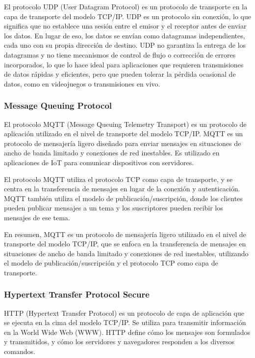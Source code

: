 El protocolo UDP (User Datagram Protocol) es un protocolo de transporte en la capa de transporte del modelo TCP/IP. UDP es un protocolo sin conexión, lo que significa que no establece una sesión entre el emisor y el receptor antes de enviar los datos. En lugar de eso, los datos se envían como datagramas independientes, cada uno con su propia dirección de destino. UDP no garantiza la entrega de los datagramas y no tiene mecanismos de control de flujo o corrección de errores incorporados, lo que lo hace ideal para aplicaciones que requieren transmisiones de datos rápidas y eficientes, pero que pueden tolerar la pérdida ocasional de datos, como en videojuegos o transmisiones en vivo.


\subsubsection{Message Queuing Protocol}

El protocolo MQTT (Message Queuing Telemetry Transport) es un protocolo de aplicación utilizado en el nivel de transporte del modelo TCP/IP. MQTT es un protocolo de mensajería ligero diseñado para enviar mensajes en situaciones de ancho de banda limitado y conexiones de red inestables. Es utilizado en aplicaciones de IoT para comunicar dispositivos con servidores.

El protocolo MQTT utiliza el protocolo TCP como capa de transporte, y se centra en la transferencia de mensajes en lugar de la conexión y autenticación. MQTT también utiliza el modelo de publicación/suscripción, donde los clientes pueden publicar mensajes a un tema y los suscriptores pueden recibir los mensajes de ese tema.

En resumen, MQTT es un protocolo de mensajería ligero utilizado en el nivel de transporte del modelo TCP/IP, que se enfoca en la transferencia de mensajes en situaciones de ancho de banda limitado y conexiones de red inestables, utilizando el modelo de publicación/suscripción y el protocolo TCP como capa de transporte.


\subsubsection{Hypertext Transfer Protocol Secure}


HTTP (Hypertext Transfer Protocol) es un protocolo de capa de aplicación que se ejecuta en la cima del modelo TCP/IP. Se utiliza para transmitir información en la World Wide Web (WWW). HTTP define cómo los mensajes son formulados y transmitidos, y cómo los servidores y navegadores responden a los diversos comandos.

